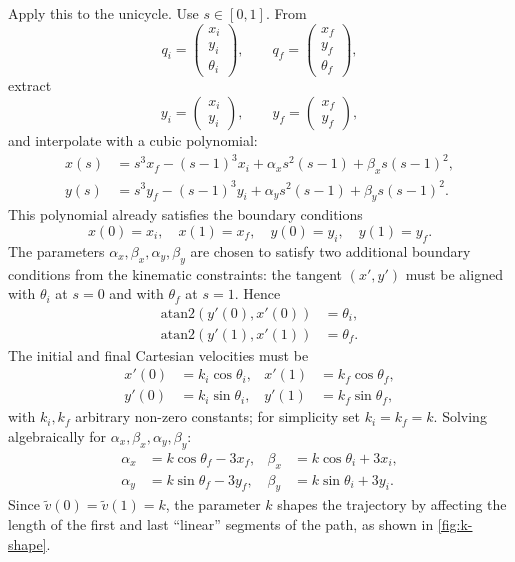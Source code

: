Apply this to the unicycle. Use \( s \in [0, 1] \). From
\[
q_i = \begin{pmatrix} x_i \\ y_i \\ \theta_i \end{pmatrix},
\qquad
q_f = \begin{pmatrix} x_f \\ y_f \\ \theta_f \end{pmatrix},
\]
extract
\[
y_i = \begin{pmatrix} x_i \\ y_i \end{pmatrix},
\qquad
y_f = \begin{pmatrix} x_f \\ y_f \end{pmatrix},
\]
and interpolate with a cubic polynomial:
\begin{align}
    x(s) &= s^3 x_f - (s-1)^3 x_i + \alpha_x s^2 (s-1) + \beta_x s (s-1)^2, \\
    y(s) &= s^3 y_f - (s-1)^3 y_i + \alpha_y s^2 (s-1) + \beta_y s (s-1)^2.
\end{align}
This polynomial already satisfies the boundary conditions
\[
x(0) = x_i, \quad x(1) = x_f, \quad y(0) = y_i, \quad y(1) = y_f.
\]
The parameters \( \alpha_x, \beta_x, \alpha_y, \beta_y \) are chosen to
satisfy two additional boundary conditions from the kinematic
constraints: the tangent \( (x', y') \) must be aligned with
\( \theta_i \) at \( s = 0 \) and with \( \theta_f \) at \( s = 1 \).
Hence
\begin{align}
    \text{atan2}(y'(0), x'(0)) &= \theta_i, \\
    \text{atan2}(y'(1), x'(1)) &= \theta_f.
\end{align}
The initial and final Cartesian velocities must be
\begin{align}
    x'(0) &= k_i \cos\theta_i, & x'(1) &= k_f \cos\theta_f, \\
    y'(0) &= k_i \sin\theta_i, & y'(1) &= k_f \sin\theta_f,
\end{align}
with \( k_i, k_f \) arbitrary non-zero constants; for simplicity set
\( k_i = k_f = k \). Solving algebraically for
\( \alpha_x, \beta_x, \alpha_y, \beta_y \):
\begin{align}
    \alpha_x &= k \cos\theta_f - 3 x_f, & \beta_x &= k \cos\theta_i + 3 x_i, \\
    \alpha_y &= k \sin\theta_f - 3 y_f, & \beta_y &= k \sin\theta_i + 3 y_i.
\end{align}
Since \( \tilde{v}(0) = \tilde{v}(1) = k \), the parameter \( k \)
shapes the trajectory by affecting the length of the first and last
``linear'' segments of the path, as shown in
\cref{fig:k-shape}.

